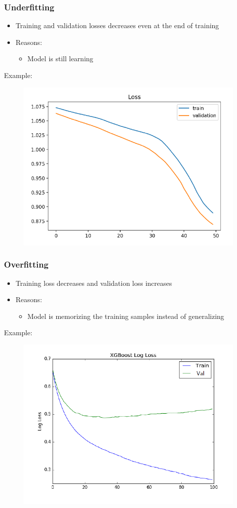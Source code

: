 \documentclass[10pt,a4paper]{article}
\newcommand{\props}{$\circ$}
\newcommand{\iprops}{\item[\props]}
\begin{document}
\subsubsection{Underfitting}
\begin{itemize}
	\item Training and validation losses decreases even at the end of training
	\iprops Reasons:
	\begin{itemize}
		\item Model is still learning
	\end{itemize}
\end{itemize}

Example:
\begin{figure}[H]
	\includegraphics[width=0.5\columnwidth]{figures/graph_underfitting.png}
\end{figure}

\subsubsection{Overfitting}
\begin{itemize}
	\item Training loss decreases and validation loss increases
	\iprops Reasons:
	\begin{itemize}
		\item Model is memorizing the training samples instead of generalizing
	\end{itemize}
\end{itemize}

Example:
\begin{figure}[H]
	\includegraphics[width=0.5\columnwidth]{figures/graph_overfitting.png}
\end{figure}
\end{document}
